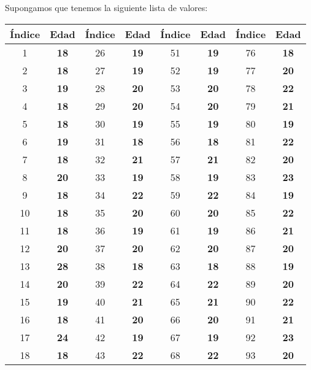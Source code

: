 \documentclass{article}
\begin{document}
Supongamos que tenemos la siguiente lista de valores:
\begin{table}[h!]
    \centering
    \begin{tabular}{|c|c|c|c|c|c|c|c|}
    \hline
    \textbf{Índice} & \textbf{Edad} & \textbf{Índice} & \textbf{Edad} & \textbf{Índice} & \textbf{Edad} & \textbf{Índice} & \textbf{Edad} \\ \hline
    1 & \textbf{18} & 26 & \textbf{19} & 51 & \textbf{19} & 76 & \textbf{18} \\ \hline
    2 & \textbf{18} & 27 & \textbf{19} & 52 & \textbf{19} & 77 & \textbf{20} \\ \hline
    3 & \textbf{19} & 28 & \textbf{20} & 53 & \textbf{20} & 78 & \textbf{22} \\ \hline
    4 & \textbf{18} & 29 & \textbf{20} & 54 & \textbf{20} & 79 & \textbf{21} \\ \hline
    5 & \textbf{18} & 30 & \textbf{19} & 55 & \textbf{19} & 80 & \textbf{19} \\ \hline
    6 & \textbf{19} & 31 & \textbf{18} & 56 & \textbf{18} & 81 & \textbf{22} \\ \hline
    7 & \textbf{18} & 32 & \textbf{21} & 57 & \textbf{21} & 82 & \textbf{20} \\ \hline
    8 & \textbf{20} & 33 & \textbf{19} & 58 & \textbf{19} & 83 & \textbf{23} \\ \hline
    9 & \textbf{18} & 34 & \textbf{22} & 59 & \textbf{22} & 84 & \textbf{19} \\ \hline
    10 & \textbf{18} & 35 & \textbf{20} & 60 & \textbf{20} & 85 & \textbf{22} \\ \hline
    11 & \textbf{18} & 36 & \textbf{19} & 61 & \textbf{19} & 86 & \textbf{21} \\ \hline
    12 & \textbf{20} & 37 & \textbf{20} & 62 & \textbf{20} & 87 & \textbf{20} \\ \hline
    13 & \textbf{28} & 38 & \textbf{18} & 63 & \textbf{18} & 88 & \textbf{19} \\ \hline
    14 & \textbf{20} & 39 & \textbf{22} & 64 & \textbf{22} & 89 & \textbf{20} \\ \hline
    15 & \textbf{19} & 40 & \textbf{21} & 65 & \textbf{21} & 90 & \textbf{22} \\ \hline
    16 & \textbf{18} & 41 & \textbf{20} & 66 & \textbf{20} & 91 & \textbf{21} \\ \hline
    17 & \textbf{24} & 42 & \textbf{19} & 67 & \textbf{19} & 92 & \textbf{23} \\ \hline
    18 & \textbf{18} & 43 & \textbf{22} & 68 & \textbf{22} & 93 & \textbf{20} \\ \hline

\end{tabular}
\end{table}
\end{document}

